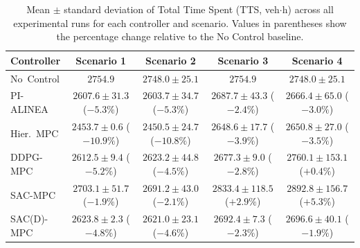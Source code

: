 \begin{table}[htbp]
\centering
\caption{Mean $\pm$ standard deviation of Total Time Spent (TTS, veh$\cdot$h) across all experimental runs for each controller and scenario. Values in parentheses show the percentage change relative to the No Control baseline.}
\label{tab:tts_comparison}
\begin{tabular}{lcccc}
\toprule
Controller & Scenario 1 & Scenario 2 & Scenario 3 & Scenario 4 \\
\midrule
No~Control & $2754.9$ & $2748.0 \pm 25.1$ & $2754.9$ & $2748.0 \pm 25.1$ \\
PI-ALINEA & $2607.6 \pm 31.3$ ($-5.3\%$) & $2603.7 \pm 34.7$ ($-5.3\%$) & $2687.7 \pm 43.3$ ($-2.4\%$) & $2666.4 \pm 65.0$ ($-3.0\%$) \\
Hier.~MPC & $2453.7 \pm 0.6$ ($-10.9\%$) & $2450.5 \pm 24.7$ ($-10.8\%$) & $2648.6 \pm 17.7$ ($-3.9\%$) & $2650.8 \pm 27.0$ ($-3.5\%$) \\
DDPG-MPC & $2612.5 \pm 9.4$ ($-5.2\%$) & $2623.2 \pm 44.8$ ($-4.5\%$) & $2677.3 \pm 9.0$ ($-2.8\%$) & $2760.1 \pm 153.1$ ($+0.4\%$) \\
SAC-MPC & $2703.1 \pm 51.7$ ($-1.9\%$) & $2691.2 \pm 43.0$ ($-2.1\%$) & $2833.4 \pm 118.5$ ($+2.9\%$) & $2892.8 \pm 156.7$ ($+5.3\%$) \\
SAC(D)-MPC & $2623.8 \pm 2.3$ ($-4.8\%$) & $2621.0 \pm 23.1$ ($-4.6\%$) & $2692.4 \pm 7.3$ ($-2.3\%$) & $2696.6 \pm 40.1$ ($-1.9\%$) \\
\bottomrule
\end{tabular}
\end{table}
